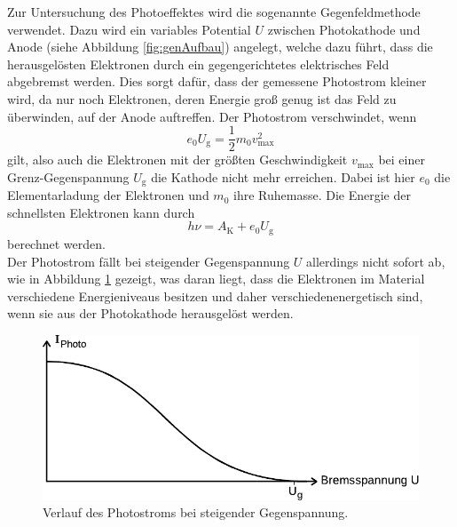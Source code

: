     Zur Untersuchung des Photoeffektes wird die sogenannte Gegenfeldmethode verwendet.
    Dazu wird ein variables Potential $U$ zwischen Photokathode und Anode (siehe Abbildung \ref{fig:genAufbau}) angelegt,
    welche dazu führt,
    dass die herausgelösten Elektronen durch ein gegengerichtetes elektrisches Feld abgebremst werden.
    Dies sorgt dafür,
    dass der gemessene Photostrom kleiner wird,
    da nur noch Elektronen,
    deren Energie groß genug ist das Feld zu überwinden,
    auf der Anode auftreffen.
    Der Photostrom verschwindet,
    wenn
    \begin{equation}
        e_0 U_\text{g} = \frac{1}{2} m_0 v_\text{max} ^2
    \end{equation}
    gilt,
    also auch die Elektronen mit der größten Geschwindigkeit $v_\text{max}$ bei einer Grenz-Gegenspannung $U_\text{g}$
    die Kathode nicht mehr erreichen.
    Dabei ist hier $e_0$ die Elementarladung der Elektronen und $m_0$ ihre Ruhemasse.
    Die Energie der schnellsten Elektronen kann durch
    \begin{equation}
        h \nu = A_\text{K} + e_0 U_\text{g}
    \end{equation}
    berechnet werden.\\
    Der Photostrom fällt bei steigender Gegenspannung $U$ allerdings nicht sofort ab, wie in Abbildung \ref{fig:GegSpannungStrom} gezeigt,
    was daran liegt,
    dass die Elektronen im Material verschiedene Energieniveaus besitzen und daher verschiedenenergetisch sind,
    wenn sie aus der Photokathode herausgelöst werden.

    \begin{figure}
        \centering
        \includegraphics[width=\textwidth]{content/img/Abb_5.pdf}
        \caption{Verlauf des Photostroms bei steigender Gegenspannung.}
        \label{fig:GegSpannungStrom}
    \end{figure}

